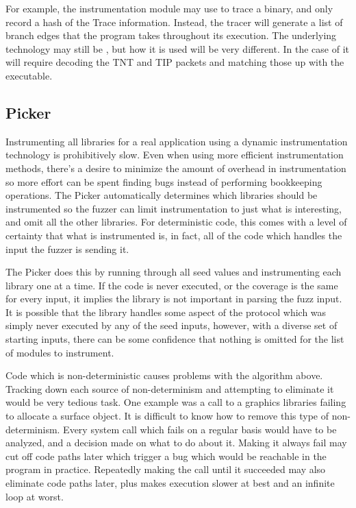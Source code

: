 For example, the instrumentation module may use \IPT{} to trace a binary, and
only record a hash of the Trace information.  Instead, the tracer will generate
a list of branch edges that the program takes throughout its execution.  The
underlying technology may still be \IPT{}, but how it is used will be very
different.  In the case of \IPT{} it will require decoding the TNT and TIP
packets and matching those up with the executable.

\subsection{Picker} \label{Picker}
Instrumenting all libraries for a real application using a dynamic
instrumentation technology is prohibitively slow. Even when using more
efficient instrumentation methods, there's a desire to minimize the amount of
overhead in instrumentation so more effort can be spent finding bugs instead of
performing bookkeeping operations.  The Picker automatically determines which
libraries should be instrumented so the fuzzer can limit instrumentation to
just what is interesting, and omit all the other libraries. For deterministic
code, this comes with a level of certainty that what is instrumented is, in
fact, all of the code which handles the input the fuzzer is sending it.

The Picker does this by running through all seed values and instrumenting each
library one at a time. If the code is never executed, or the coverage is the
same for every input, it implies the library is not important in parsing the
fuzz input.  It is possible that the library handles some aspect of the
protocol which was simply never executed by any of the seed inputs, however,
with a diverse set of starting inputs, there can be some confidence that
nothing is omitted for the list of modules to instrument.

Code which is non-deterministic causes problems with the algorithm above.
Tracking down each source of non-determinism and attempting to eliminate it
would be very tedious task. One example was a call to a graphics libraries
failing to allocate a surface object. It is difficult to know how to remove
this type of non-determinism. Every system call which fails on a regular
basis would have to be analyzed, and a decision made on what to do about it.
Making it always fail may cut off code paths later which trigger a bug which
would be reachable in the program in practice.  Repeatedly making the call
until it succeeded may also eliminate code paths later, plus makes execution
slower at best and an infinite loop at worst.

